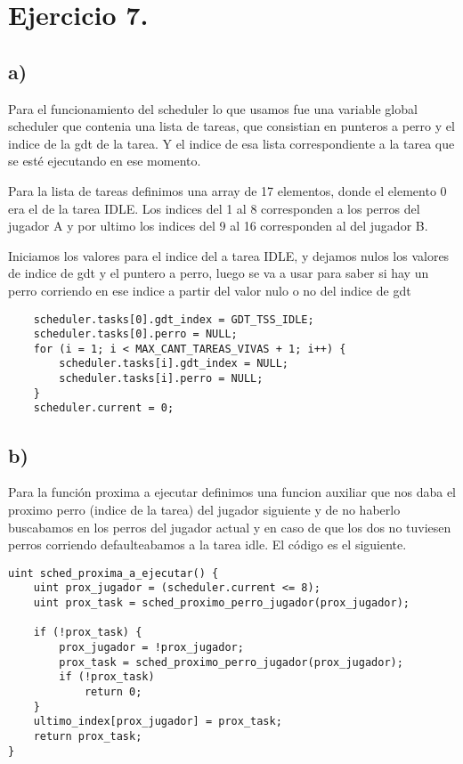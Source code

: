 \section{Ejercicio 7.}
\subsection{a)}
	Para el funcionamiento del scheduler lo que usamos fue una variable global scheduler que contenia una lista de tareas, que consistian en punteros a perro y el indice de la gdt de la tarea. Y el indice de esa lista correspondiente a la tarea que se esté ejecutando en ese momento.
	
	Para la lista de tareas definimos una array de 17 elementos, donde el elemento 0 era el de la tarea IDLE. Los indices del 1 al 8 corresponden a los perros del jugador A y por ultimo los indices del 9 al 16 corresponden al del jugador B.

	Iniciamos los valores para el indice del a tarea IDLE, y dejamos nulos los valores de indice de gdt y el puntero a perro, luego se va a usar para saber si hay un perro corriendo en ese indice a partir del valor nulo o no del indice de gdt
\begin{codesnippet}
\begin{verbatim}
    scheduler.tasks[0].gdt_index = GDT_TSS_IDLE;
    scheduler.tasks[0].perro = NULL;
    for (i = 1; i < MAX_CANT_TAREAS_VIVAS + 1; i++) {
        scheduler.tasks[i].gdt_index = NULL;
        scheduler.tasks[i].perro = NULL;
    }
    scheduler.current = 0;
\end{verbatim}
\end{codesnippet}

\subsection{b)}

Para la función proxima a ejecutar definimos una funcion auxiliar que nos daba el proximo perro (indice de la tarea) del jugador siguiente y de no haberlo buscabamos en los perros del jugador actual y en caso de que los dos no tuviesen perros corriendo defaulteabamos a la tarea idle. El código es el siguiente.

\begin{codesnippet}
\begin{verbatim}
uint sched_proxima_a_ejecutar() {
    uint prox_jugador = (scheduler.current <= 8);
    uint prox_task = sched_proximo_perro_jugador(prox_jugador);

    if (!prox_task) {
        prox_jugador = !prox_jugador;
        prox_task = sched_proximo_perro_jugador(prox_jugador);
        if (!prox_task)
            return 0;
    }
    ultimo_index[prox_jugador] = prox_task;
    return prox_task;
}
\end{verbatim}
\end{codesnippet}

